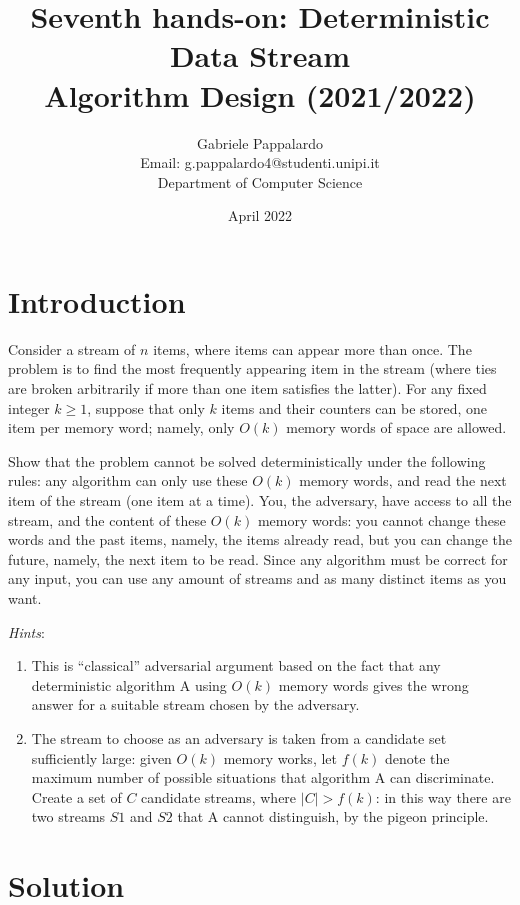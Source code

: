 \documentclass{article}
\title{Seventh hands-on: Deterministic Data Stream \\[1ex] \large Algorithm Design (2021/2022)}
\author{Gabriele Pappalardo\\Email: g.pappalardo4@studenti.unipi.it\\Department of Computer Science}
\date{April 2022}
\begin{document}
\maketitle

\section{Introduction}

Consider a stream of $n$ items, where items can appear more than once. The problem is to find the most frequently appearing item in the stream (where ties are broken arbitrarily if more than one item satisfies the latter). 
For any fixed integer $k \ge 1$, suppose that only $k$ items and their counters can be stored, one item per memory word; namely, 
only $O(k)$ memory words of space are allowed. 
\newline

\noindent Show that the problem cannot be solved deterministically under the following rules: any algorithm can only use these $O(k)$ memory words, and read the next item of the stream (one item at a time). 
You, the adversary, have access to all the stream, and the content of these $O(k)$ memory words: 
you cannot change these words and the past items, namely, the items already read, but you can change the future, 
namely, the next item to be read. Since any algorithm must be correct for any input, you can use any amount of streams and as many distinct items as you want.  
\newline

\noindent \textit{Hints}:
\begin{enumerate}
    \item This is ``classical'' adversarial argument based on the fact that any deterministic algorithm A using $O(k)$ memory words gives the wrong answer for a suitable stream chosen by the adversary. 
    \item The stream to choose as an adversary is taken from a candidate set sufficiently large: given $O(k)$ memory works, let $f(k)$ denote the maximum number of possible situations that algorithm A can discriminate. Create a set of $C$ candidate streams, where $|C| > f(k)$: in this way there are two streams $S1$ and $S2$ that A cannot distinguish, by the pigeon principle. 
\end{enumerate}

\section{Solution}
\end{document}
